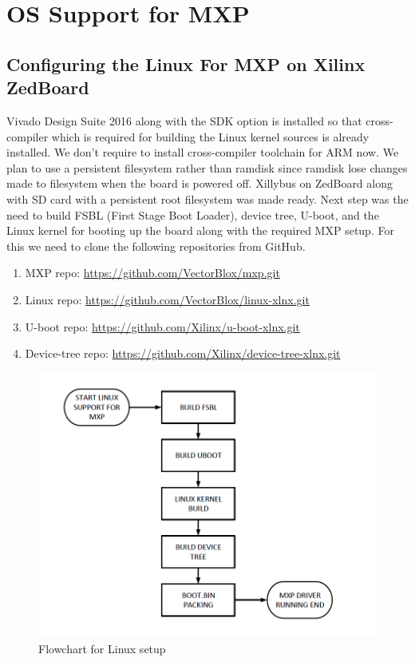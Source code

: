 \newpage
\chapter{OS Support for MXP}
\section{Configuring the Linux For MXP on Xilinx ZedBoard}

Vivado Design Suite 2016 along with the SDK option is installed so that cross-compiler which is required for building the Linux kernel sources is already installed. We don't require to install cross-compiler toolchain for ARM now. We plan to use a persistent filesystem rather than ramdisk since ramdisk lose changes made to filesystem when the board is powered off. Xillybus on ZedBoard along with SD card with a persistent root filesystem was made ready. Next step was the need to build FSBL (First Stage Boot Loader), device tree, U-boot, and the Linux kernel for booting up the board along with the required MXP setup. For this we need to clone the following repositories from GitHub.

\begin{enumerate}

	\item MXP repo: \url{https://github.com/VectorBlox/mxp.git}

	\item Linux repo: 	 \url{https://github.com/VectorBlox/linux-xlnx.git}

	\item U-boot repo: \url{https://github.com/Xilinx/u-boot-xlnx.git}

	\item Device-tree repo: \url{https://github.com/Xilinx/device-tree-xlnx.git}

\end{enumerate}

\begin{figure}
	\centering
	\includegraphics[width=.9\textwidth]{images/bootloader.png}
 
	\caption{Flowchart for Linux setup}
	\label{zed:boot}
\end{figure}




